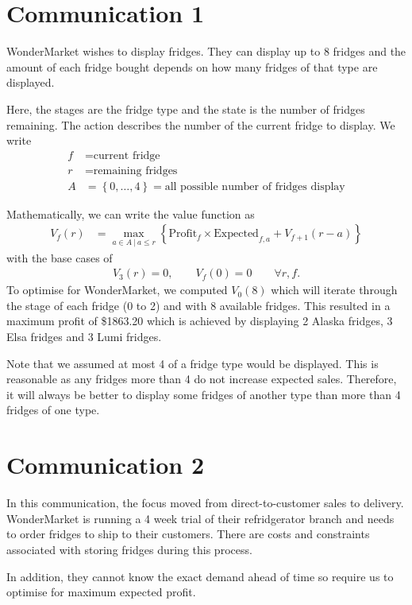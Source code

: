 \documentclass[11pt,a4paper]{article}
\begin{document}
\section{Communication 1}
WonderMarket wishes to display fridges. They can display up to 8 
fridges and the amount of each fridge bought depends on how many 
fridges of that type are displayed.

Here, the stages are the fridge type and the state is the number of 
fridges remaining. The action describes the number of the current 
fridge to display. We write 
\begin{align*}
    f &= \text{current fridge} \\ 
    r &= \text{remaining fridges} \\ 
    A &= \left\{ 0, \ldots, 4\right\} = \text{all possible number of fridges display} 
\end{align*}

Mathematically, we can write the value function as 
\begin{align*}
    V_f(r) &= \max_{a \in A ~|~a\le r} 
    \left\{ \mathrm{Profit}_f \times \mathrm{Expected}_{f,a} + V_{f+1}(r-a)\right\}
\end{align*}
with the base cases of 
\begin{align*}
    V_3(r) = 0, \qquad V_f(0) = 0 \qquad \forall r, f.
\end{align*}
To optimise for WonderMarket, we computed $V_0(8)$ which will iterate through 
the stage of each fridge (0 to 2) and with 8 available fridges. This resulted in 
a maximum profit of \$1863.20 which is achieved by displaying 
2 Alaska fridges, 3 Elsa fridges and 3 Lumi fridges.

Note that we assumed at most 4 of a fridge type would be displayed. This is reasonable 
as any fridges more than 4 do not increase expected sales. Therefore, it will 
always be better to display some fridges of another type than more than 4 fridges 
of one type.

\section{Communication 2}
In this communication, the focus moved from direct-to-customer sales to delivery.
WonderMarket is running a 4 week trial of their refridgerator branch and 
needs to order fridges to ship to their customers. There are costs 
and constraints associated with storing fridges during this process. 

In addition, 
they cannot know the exact demand ahead of time so require us to optimise for 
maximum expected profit. 
\end{document}
